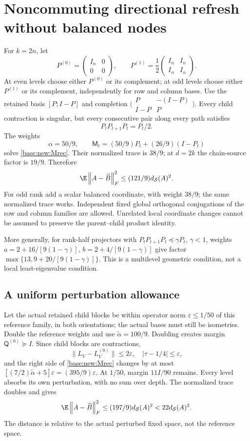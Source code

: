 \documentclass[11pt,oneside,openany,a4paper]{book}
\numberwithin{equation}{chapter}
\theoremstyle{definition}
\theoremstyle{remark}
\newcommand{\F}[1]{\left\lVert#1\right\rVert_F}
\begin{document}
\section{Noncommuting directional refresh without balanced nodes}\label{base:new:refresh}
For $k=2n$, let
\[
 P^{(0)}=\begin{pmatrix}I_n&0\\0&0\end{pmatrix},\qquad
 P^{(1)}=\frac12\begin{pmatrix}I_n&I_n\\I_n&I_n\end{pmatrix}.
\]
At even levels choose either $P^{(0)}$ or its complement; at odd levels choose either $P^{(1)}$ or its complement, independently for row and column bases. Use the retained basis $[P;I-P]$ and completion $\bigl(\begin{smallmatrix}P&-(I-P)\\I-P&P\end{smallmatrix}\bigr)$. Every child contraction is singular, but every consecutive pair along every path satisfies
\[
 P_tP_{t+1}P_t=P_t/2.
\]
The weights
\[
 \alpha=50/9,\qquad
 \mathsf M_t=(50/9)P_t+(26/9)(I-P_t)
\]
solve \eqref{base:new:Mrec}. Their normalized trace is $38/9$; at $d=2k$ the chain-source factor is $19/9$. Therefore
\begin{equation}\label{base:new:121}
 \E\F{A-\widehat B}^2\le(121/9)d_{\mathcal S}(A)^2.
\end{equation}
For odd rank add a scalar balanced coordinate, with weight $38/9$; the same normalized trace works. Independent fixed global orthogonal conjugations of the row and column families are allowed. Unrelated local coordinate changes cannot be assumed to preserve the parent--child product identity.

More generally, for rank-half projectors with $P_tP_{t+1}P_t\preceq\gamma P_t$, $\gamma<1$, weights
$a=2+16/[9(1-\gamma)]$, $b=2+4/[9(1-\gamma)]$ give factor
$\max\{13,9+20/[9(1-\gamma)]\}$. This is a multilevel geometric condition, not a local least-eigenvalue condition.

\subsection{A uniform perturbation allowance}
Let the actual retained child blocks be within operator norm $\varepsilon\le1/50$ of this reference family, in both orientations; the actual bases must still be isometries. Double the reference weights and use $\widetilde\alpha=100/9$. Doubling creates margin $\mathsf Q^{(0)}\succeq I$. Since child blocks are contractions,
\[
 \|L_V-L_V^{(0)}\|\le2\varepsilon,\quad
 |\tau-1/4|\le\varepsilon,
\]
and the right side of \eqref{base:new:Mrec} changes by at most
$[(7/2)\widetilde\alpha+5]\varepsilon=(395/9)\varepsilon$.
At $1/50$, margin $11I/90$ remains. Every level absorbs its own perturbation, with no sum over depth. The normalized trace doubles and gives
\begin{equation}\label{base:new:197}
 \E\F{A-\widehat B}^2\le(197/9)d_{\mathcal S}(A)^2<22d_{\mathcal S}(A)^2.
\end{equation}
The distance is relative to the actual perturbed fixed space, not the reference space.
\end{document}
